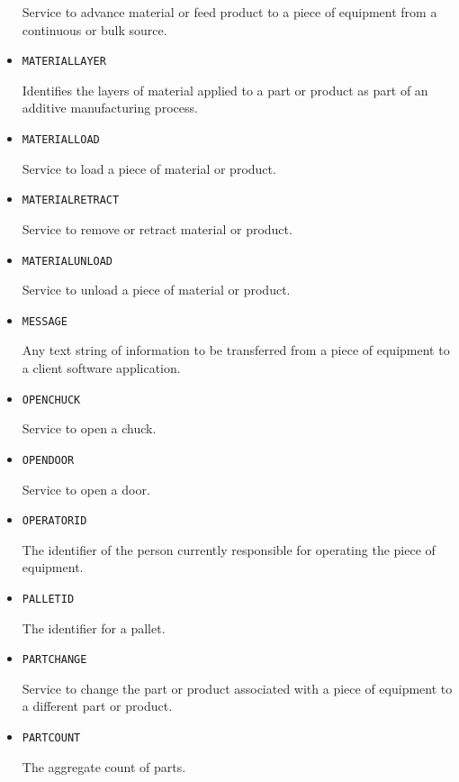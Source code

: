 \begin{itemize}
Service to advance material or feed product to a piece of equipment from a continuous or bulk source.


\item \texttt{MATERIAL\textunderscore LAYER}  

Identifies the layers of material applied to a part or product as part of an additive manufacturing process.


\item \texttt{MATERIAL\textunderscore LOAD}  

Service to load a piece of material or product.


\item \texttt{MATERIAL\textunderscore RETRACT}  

Service to remove or retract material or product.


\item \texttt{MATERIAL\textunderscore UNLOAD}  

Service to unload a piece of material or product.


\item \texttt{MESSAGE}  

Any text string of information to be transferred from a piece of equipment to a client software application.


\item \texttt{OPEN\textunderscore CHUCK}  

Service to open a chuck.


\item \texttt{OPEN\textunderscore DOOR}  

Service to open a door.


\item \texttt{OPERATOR\textunderscore ID}  

The identifier of the person currently responsible for operating the piece of equipment.


\item \texttt{PALLET\textunderscore ID}  

The identifier for a pallet.


\item \texttt{PART\textunderscore CHANGE}  

Service to change the part or product associated with a piece of equipment to a different part or product.


\item \texttt{PART\textunderscore COUNT}  

The aggregate count of parts.



\end{itemize}

